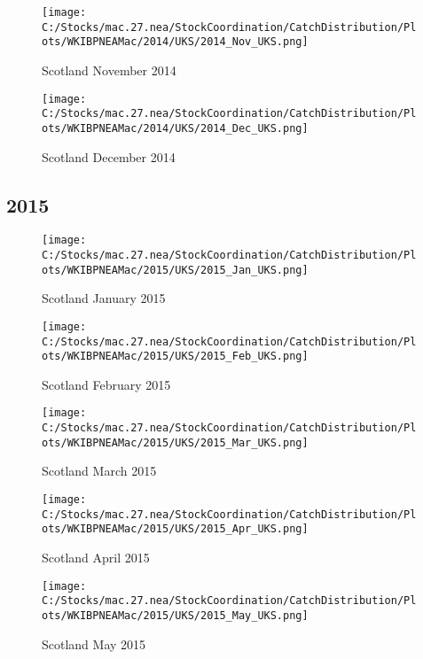 \documentclass{article}
\begin{document}
\begin{figure}
	\centering
		\texttt{[image: C:/Stocks/mac.27.nea/StockCoordination/CatchDistribution/Plots/WKIBPNEAMac/2014/UKS/2014\_Nov\_UKS.png]}
	\caption{Scotland November 2014}
	\label{fig:2014_Nov_UKS}
\end{figure}

\begin{figure}
	\centering
		\texttt{[image: C:/Stocks/mac.27.nea/StockCoordination/CatchDistribution/Plots/WKIBPNEAMac/2014/UKS/2014\_Dec\_UKS.png]}
	\caption{Scotland December 2014}
	\label{fig:2014_Dec_UKS}
\end{figure}

\clearpage

\newpage

\subsection{2015}



\begin{figure}[h]
	\centering
		\texttt{[image: C:/Stocks/mac.27.nea/StockCoordination/CatchDistribution/Plots/WKIBPNEAMac/2015/UKS/2015\_Jan\_UKS.png]}
	\caption{Scotland January 2015}
	\label{fig:2015_Jan_UKS}
\end{figure}

\begin{figure}
	\centering
		\texttt{[image: C:/Stocks/mac.27.nea/StockCoordination/CatchDistribution/Plots/WKIBPNEAMac/2015/UKS/2015\_Feb\_UKS.png]}
	\caption{Scotland February 2015}
	\label{fig:2015_Feb_UKS}
\end{figure}

\begin{figure}
	\centering
		\texttt{[image: C:/Stocks/mac.27.nea/StockCoordination/CatchDistribution/Plots/WKIBPNEAMac/2015/UKS/2015\_Mar\_UKS.png]}
	\caption{Scotland March 2015}
	\label{fig:2015_Mar_UKS}
\end{figure}

\begin{figure}
	\centering
		\texttt{[image: C:/Stocks/mac.27.nea/StockCoordination/CatchDistribution/Plots/WKIBPNEAMac/2015/UKS/2015\_Apr\_UKS.png]}
	\caption{Scotland April 2015}
	\label{fig:2015_Apr_UKS}
\end{figure}

\begin{figure}
	\centering
		\texttt{[image: C:/Stocks/mac.27.nea/StockCoordination/CatchDistribution/Plots/WKIBPNEAMac/2015/UKS/2015\_May\_UKS.png]}
	\caption{Scotland May 2015}
	\label{fig:2015_May_UKS}
\end{figure}
\end{document}
